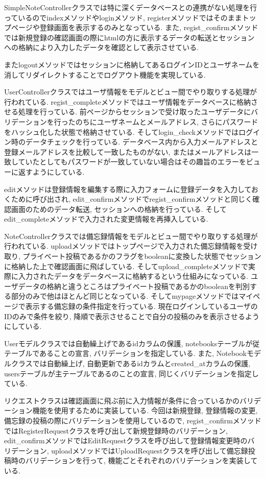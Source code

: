 \documentclass[submit,techrep]{ipsj}
\begin{document}
SimpleNoteControllerクラスでは特に深くデータベースとの連携がない処理を行っているのでindexメソッドやloginメソッド, registerメソッドではそのままトップページや登録画面を表示するのみとなっている. また, regist\_confirmメソッドでは新規登録の確認画面の際にhtmlの方に表示するデータの転送とセッションへの格納により入力したデータを確認として表示させている. 

またlogoutメソッドではセッションに格納してあるログインIDとユーザネームを消してリダイレクトすることでログアウト機能を実現している. 

UserControllerクラスではユーザ情報をモデルとビュー間でやり取りする処理が行われている. regist\_completeメソッドではユーザ情報をデータベースに格納させる処理を行っている. 前ページからセッションで受け取ったユーザデータにバリデーションを行ったのちにユーザネームとメールアドレス, さらにパスワードをハッシュ化した状態で格納させている. 
そしてlogin\_checkメソッドではログイン時のデータチェックを行っている. データベース内から入力メールアドレスと登録メールアドレスを比較して一致したものがない, またはメールアドレスは一致していたとしてもパスワードが一致していない場合はその趣旨のエラーをビューに返すようにしている. 

editメソッドは登録情報を編集する際に入力フォームに登録データを入力しておくために呼び出され, edit\_confirmメソッドでregist\_confirmメソッドと同じく確認画面のためのデータ転送, セッションへの格納を行っている. そしてedit\_completeメソッドで入力された変更情報を再挿入している. 

NoteControllerクラスでは備忘録情報をモデルとビュー間でやり取りする処理が行われている. uploadメソッドではトップページで入力された備忘録情報を受け取り, プライベート投稿であるかのフラグをbooleanに変換した状態でセッションに格納した上で確認画面に飛ばしている. 
そしてupload\_completeメソッドで実際に入力されたデータをデータベースに格納するという仕組みになっている. ユーザデータの格納と違うところはプライベート投稿であるかのbooleanを判別する部分のみで他はほとんど同じとなっている. そしてmypageメソッドではマイページで表示する備忘録の条件指定を行っている. 現在ログインしているユーザのIDのみで条件を絞り, 降順で表示させることで自分の投稿のみを表示させるようにしている. 

Userモデルクラスでは自動繰上げであるidカラムの保護, notebooksテーブルが従テーブルであることの宣言, バリデーションを指定している. 
また, Notebookモデルクラスでは自動繰上げ, 自動更新であるidカラムとcreated\_atカラムの保護, usersテーブルが主テーブルであるのことの宣言, 同じくバリデーションを指定している. 

リクエストクラスは確認画面に飛ぶ前に入力情報が条件に合っているかのバリデーション機能を使用するために実装している. 今回は新規登録, 登録情報の変更, 備忘録の投稿の際にバリデーションを使用しているので, regist\_confirmメソッドではRegisterRequestクラスを呼び出して新規登録時のバリデーション, edit\_confirmメソッドではEditRequestクラスを呼び出して登録情報変更時のバリデーション, uploadメソッドではUploadRequestクラスを呼び出して備忘録投稿時のバリデーションを行って, 機能ごとそれぞれのバリデーションを実装している. 
\end{document}
